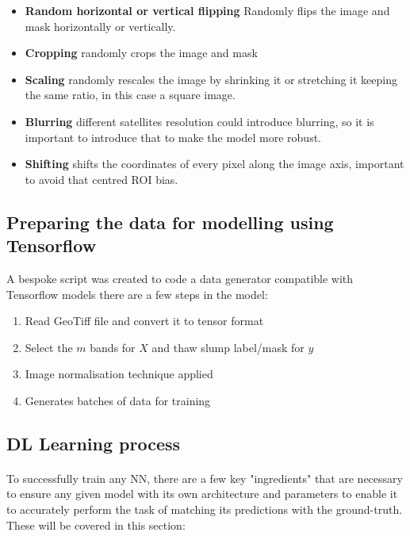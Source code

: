     \begin{itemize}
        \item \textbf{Random horizontal or vertical flipping} Randomly flips the image and mask horizontally or vertically.
        \item \textbf{Cropping} randomly crops the image and mask
        \item \textbf{Scaling} randomly rescales the image by shrinking it or stretching it keeping the same ratio, in this case a square image.
        \item \textbf{Blurring} different satellites resolution could introduce blurring, so it is important to introduce that to make the model more robust.
        \item \textbf{Shifting} shifts the coordinates of every pixel along the image axis, important to avoid that centred \gls{ROI} bias.
    \end{itemize}
\subsection{Preparing the data for modelling using Tensorflow} \label{tf_dataprep}
A bespoke script was created to code a data generator compatible with Tensorflow models there are a few steps in the model:

\begin{enumerate}
    \item Read GeoTiff file and convert it to tensor format
    \item Select the $m$ bands for $X$ and thaw slump label/mask for $y$
    \item Image normalisation technique applied
    \item Generates batches of data for training
\end{enumerate}
\subsection{\gls{DL} Learning process} \label{nn_hyperparameters}
\paragraph{}
To successfully train any \gls{NN}, there are a few key "ingredients" that are necessary to ensure any given model with its own architecture and parameters to enable it to accurately perform the task of matching its predictions with the ground-truth. These will be covered in this section:

